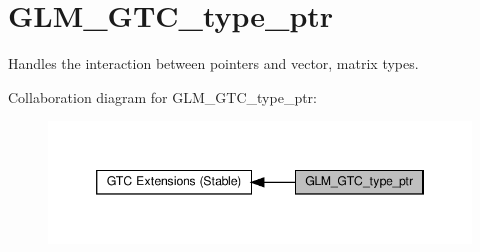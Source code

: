 \hypertarget{group__gtc__type__ptr}{}\section{G\+L\+M\+\_\+\+G\+T\+C\+\_\+type\+\_\+ptr}
\label{group__gtc__type__ptr}


Handles the interaction between pointers and vector, matrix types.  


Collaboration diagram for G\+L\+M\+\_\+\+G\+T\+C\+\_\+type\+\_\+ptr\+:\nopagebreak
\begin{figure}[H]
\begin{center}
\leavevmode
\includegraphics[width=346pt]{group__gtc__type__ptr}
\end{center}
\end{figure}
